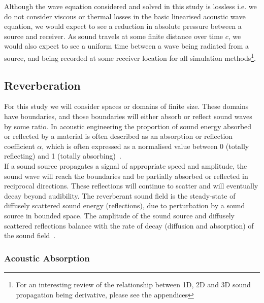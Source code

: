 Although the wave equation considered and solved in this study is lossless i.e. we do not consider viscous or thermal losses in the basic linearised acoustic wave equation, we would expect to see a reduction in absolute pressure between a source and receiver. As sound travels at some finite distance over time $c$, we would also expect to see a uniform time between a wave being radiated from a source, and being recorded at some receiver location for all simulation methods\footnote{For an interesting review of the relationship between 1D, 2D and 3D sound propagation being derivative, please see the appendices}.\\ 

\subsection{Reverberation}
For this study we will consider spaces or domains of finite size. These domains have boundaries, and those boundaries will either absorb or reflect sound waves by some ratio. In acoustic engineering the proportion of sound energy absorbed or reflected by a material is often described as an absorption or reflection coefficient $\alpha$, which is often expressed as a normalised value between 0 (totally reflecting) and 1 (totally absorbing)~\cite{beranek1954acoustics}.\\
If a sound source propagates a signal of appropriate speed and amplitude, the sound wave will reach the boundaries and be partially absorbed or reflected in reciprocal directions. These reflections will continue to scatter and will eventually decay beyond audibility. The reverberant sound field is the steady-state of diffusely scattered sound energy (reflections), due to perturbation by a sound source in bounded space. The amplitude of the sound source and diffusely scattered reflections balance with the rate of decay (diffusion and absorption) of the sound field~\cite{Everest2009}.\\

\subsubsection{Acoustic Absorption}

